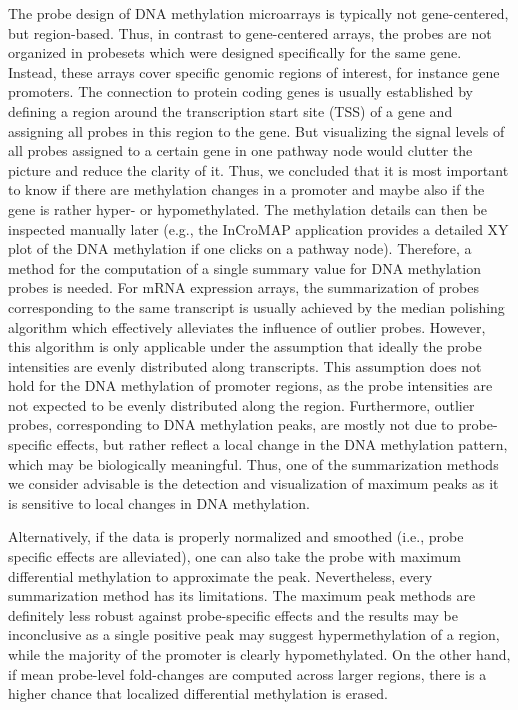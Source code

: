 \documentclass{bioinfo}
\begin{document}
The probe design of DNA methylation microarrays is typically not gene-centered, but
region-based. Thus, in contrast to gene-centered arrays, the probes are not organized in
probesets which were designed specifically for the same gene. Instead, these arrays
cover specific genomic regions of interest, for instance gene promoters. The connection to protein
coding genes is usually established by defining a region around the transcription start site (TSS)
of a gene and assigning all probes in this region to the gene.
%
But visualizing the signal levels of all probes assigned to a certain gene in one pathway node would
clutter the picture and reduce the clarity of it.
Thus, we concluded that it is most important to know if there are methylation changes in a promoter and maybe also if the gene
is rather hyper- or hypomethylated. The methylation details can then be inspected manually later
(e.g., the InCroMAP application provides a detailed XY plot of the DNA methylation if one clicks on a pathway node).
Therefore, a method for the computation of a single summary value for DNA methylation probes is needed. For mRNA expression arrays, the summarization of probes corresponding to
the same transcript is usually achieved by the median polishing algorithm \citep[see][]{GCRMA} which
effectively alleviates the influence of outlier probes. However, this algorithm is only applicable under the assumption
that ideally the probe intensities are evenly distributed along transcripts.
This assumption does not hold for the DNA methylation of promoter regions, as the probe intensities are
not expected to be evenly distributed along the region. Furthermore, outlier probes, corresponding to
DNA methylation peaks, are mostly not due to probe-specific effects, but rather reflect a local change
in the DNA methylation pattern, which may be biologically meaningful. Thus, one of the summarization methods we
consider advisable is the detection and visualization of maximum peaks as it is sensitive to local changes in DNA methylation.

Alternatively, if the data is properly normalized and smoothed (i.e., probe specific effects are alleviated), one can also take the probe with maximum differential methylation to approximate the peak.
Nevertheless, every summarization method has its limitations. The maximum peak methods are definitely
less robust against probe-specific effects and the results may be inconclusive as a single positive peak may
suggest hypermethylation of a region, while the majority of the promoter is clearly hypomethylated.
On the other hand, if mean probe-level fold-changes are computed across larger regions, there is a higher chance that localized differential methylation is erased.
\end{document}
